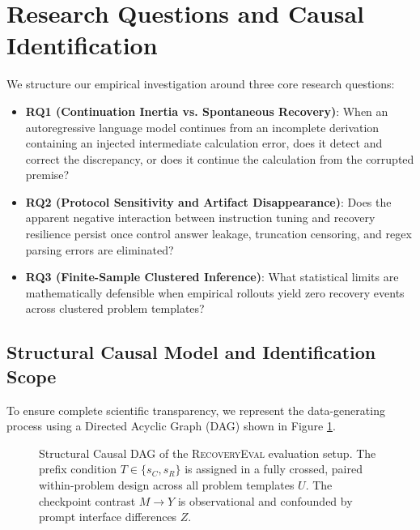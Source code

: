 \documentclass[11pt,letterpaper]{article}
\newcommand{\framework}{\textsc{RecoveryEval}}
\begin{document}
\section{Research Questions and Causal Identification}

We structure our empirical investigation around three core research questions:
\begin{itemize}[leftmargin=*]
    \item \textbf{RQ1 (Continuation Inertia vs. Spontaneous Recovery)}: When an autoregressive language model continues from an incomplete derivation containing an injected intermediate calculation error, does it detect and correct the discrepancy, or does it continue the calculation from the corrupted premise?
    \item \textbf{RQ2 (Protocol Sensitivity and Artifact Disappearance)}: Does the apparent negative interaction between instruction tuning and recovery resilience persist once control answer leakage, truncation censoring, and regex parsing errors are eliminated?
    \item \textbf{RQ3 (Finite-Sample Clustered Inference)}: What statistical limits are mathematically defensible when empirical rollouts yield zero recovery events across clustered problem templates?
\end{itemize}

\subsection{Structural Causal Model and Identification Scope}

To ensure complete scientific transparency, we represent the data-generating process using a Directed Acyclic Graph (DAG) shown in Figure \ref{fig:dag}.

\begin{figure}[htbp]
\centering
{}
\caption{Structural Causal DAG of the \framework{} evaluation setup. The prefix condition $T \in \{s_C, s_R\}$ is assigned in a fully crossed, paired within-problem design across all problem templates $U$. The checkpoint contrast $M \to Y$ is observational and confounded by prompt interface differences $Z$.}
\label{fig:dag}
\end{figure}
\end{document}
